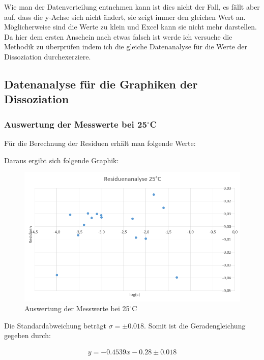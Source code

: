 Wie man der Datenverteilung entnehmen kann ist dies nicht der Fall, es fällt aber auf, dass die y-Achse sich nicht ändert, sie zeigt immer den 
gleichen Wert an. Möglicherweise sind die Werte zu klein und Excel kann sie nicht mehr darstellen. Da hier dem ersten Anschein nach etwas falsch ist
werde ich versuche die Methodik zu überprüfen indem ich die gleiche Datenanalyse für die Werte der Dissoziation durchexerziere.

\subsection{Datenanalyse für die Graphiken der Dissoziation}

\subsubsection{Auswertung der Messwerte bei 25$^\circ$C}

Für die Berechnung der Residuen erhält man folgende Werte:



Daraus ergibt sich folgende Graphik:

\begin{figure}[H]
    \centering
    \includegraphics[scale=.7]{../src/img/residuen_25C.png}
    \caption{Auswertung der Messwerte bei 25$^\circ$C}
\end{figure}

Die Standardabweichung beträgt $\sigma = \pm 0.018$. Somit ist die Geradengleichung gegeben durch:

\begin{align*}
    y = -0.4539 x - 0.28 \pm 0.018
\end{align*}

